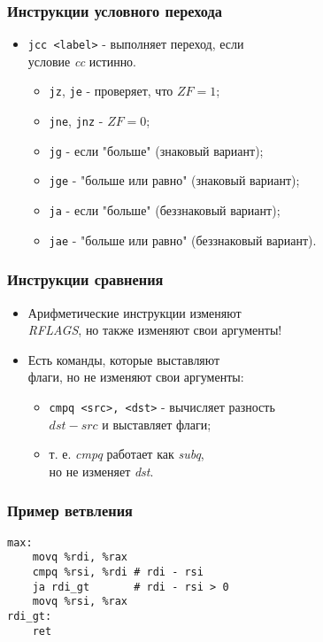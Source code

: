 \begin{frame}[fragile]
\frametitle{Инструкции условного перехода}
\begin{itemize}
    \item<1->\lstinline|jcc <label>| - выполняет переход, если\\
    условие \emph{cc} истинно.
    \begin{itemize}
        \item<2->\lstinline|jz|, \lstinline|je| - проверяет, что $ZF = 1$;
        \item<2->\lstinline|jne|, \lstinline|jnz| - $ZF = 0$;
        \item<3->\lstinline|jg| - если "больше" (знаковый вариант);
        \item<3->\lstinline|jge| - "больше или равно" (знаковый вариант);
        \item<4->\lstinline|ja| - если "больше" (беззнаковый вариант);
        \item<4->\lstinline|jae| - "больше или равно" (беззнаковый вариант).
    \end{itemize}
\end{itemize}
\end{frame}

\begin{frame}[fragile]
\frametitle{Инструкции сравнения}
\begin{itemize}
    \item<1->Арифметические инструкции изменяют \\
    \emph{RFLAGS}, но также изменяют свои аргументы!
    \item<3->Есть команды, которые выставляют\\
    флаги, но не изменяют свои аргументы:
    \begin{itemize}
        \item \lstinline|cmpq <src>, <dst>| - вычисляет разность \\
        $dst - src$ и выставляет флаги;
        \item т. е. \emph{cmpq} работает как \emph{subq}, \\
        но не изменяет \emph{dst}.
    \end{itemize}
\end{itemize}
\end{frame}

\begin{frame}[fragile]
\frametitle{Пример ветвления}
\begin{lstlisting}
max:
    movq %rdi, %rax
    cmpq %rsi, %rdi # rdi - rsi
    ja rdi_gt       # rdi - rsi > 0
    movq %rsi, %rax
rdi_gt:
    ret
\end{lstlisting}
\end{frame}
